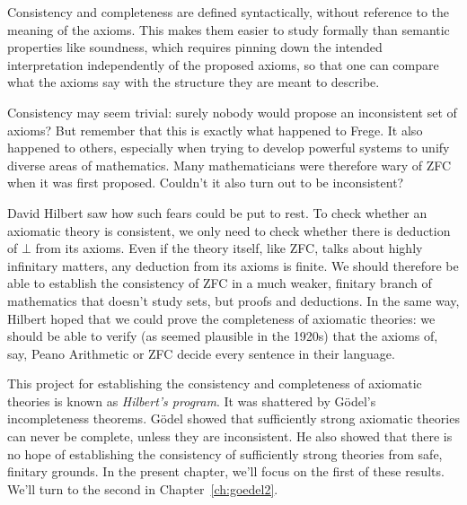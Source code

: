 Consistency and completeness are defined syntactically,
without reference to the meaning of the axioms.
This makes them easier to study formally than semantic properties like soundness,
which requires pinning down the intended interpretation independently of the proposed axioms,
so that one can compare what the axioms say with the structure they are meant to describe.

Consistency may seem trivial:
surely nobody would propose an inconsistent set of axioms?
But remember that this is exactly what happened to Frege.
It also happened to others,
especially when trying to develop powerful systems to unify diverse areas of mathematics.
Many mathematicians were therefore wary of ZFC when it was first proposed.
Couldn't it also turn out to be inconsistent?

David Hilbert saw how such fears could be put to rest.
To check whether an axiomatic theory is consistent,
we only need to check whether there is deduction of $\bot$ from its axioms.
Even if the theory itself, like ZFC, talks about highly infinitary matters,
any deduction from its axioms is finite.
We should therefore be able to establish the consistency of ZFC
in a much weaker, finitary branch of mathematics
that doesn't study sets,
but proofs and deductions.
In the same way,
Hilbert hoped that we could prove the completeness of axiomatic theories:
we should be able to verify
(as seemed plausible in the 1920s)
that the axioms of, say, Peano Arithmetic or ZFC decide every sentence in their language.

This project for establishing the consistency and completeness of axiomatic theories
is known as \emph{Hilbert's program}.
It was shattered by Gödel's incompleteness theorems.
Gödel showed that
sufficiently strong axiomatic theories can never be complete,
unless they are inconsistent.
He also showed that
there is no hope of establishing the consistency of sufficiently strong theories
from safe, finitary grounds.
In the present chapter, we'll focus on the first of these results.
We'll turn to the second in Chapter~\ref{ch:goedel2}.

